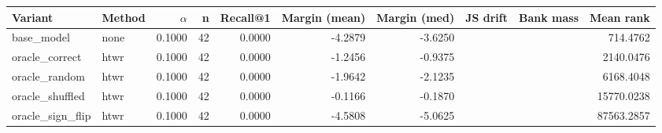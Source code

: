 \begin{tabular}{l l r r r r r r r r}
\toprule
Variant & Method & $\alpha$ & n & Recall@1 & Margin (mean) & Margin (med) & JS drift & Bank mass & Mean rank \\
\midrule
base\_model & none & 0.1000 & 42 & 0.0000 & -4.2879 & -3.6250 &  &  & 714.4762 \\
oracle\_correct & htwr & 0.1000 & 42 & 0.0000 & -1.2456 & -0.9375 &  &  & 2140.0476 \\
oracle\_random & htwr & 0.1000 & 42 & 0.0000 & -1.9642 & -2.1235 &  &  & 6168.4048 \\
oracle\_shuffled & htwr & 0.1000 & 42 & 0.0000 & -0.1166 & -0.1870 &  &  & 15770.0238 \\
oracle\_sign\_flip & htwr & 0.1000 & 42 & 0.0000 & -4.5808 & -5.0625 &  &  & 87563.2857 \\
\bottomrule
\end{tabular}
